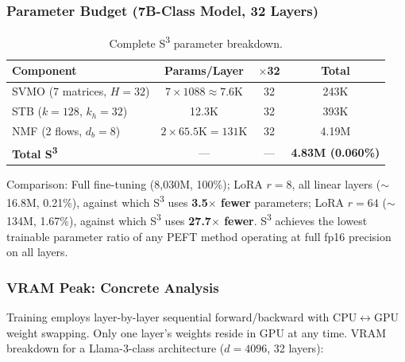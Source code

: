 \documentclass[conference]{IEEEtran}
\begin{document}
\subsubsection{Parameter Budget (7B-Class Model, 32 Layers)}

\begin{table}[t]
\centering
\caption{Complete S\textsuperscript{3} parameter breakdown.}
\label{tab:params}
\setlength{\tabcolsep}{2pt}
\begin{tabular}{@{}lccc@{}}
\toprule
\textbf{Component} & \textbf{Params/Layer} & $\times$32 & \textbf{Total} \\
\midrule
SVMO (7 matrices, $H{=}32$) & $7 \times 1088 \approx 7.6$K & 32 & 243K \\
STB ($k{=}128$, $k_h{=}32$) & 12.3K & 32 & 393K \\
NMF (2 flows, $d_b{=}8$) & $2 \times 65.5\text{K} = 131$K & 32 & 4.19M \\
\midrule
\textbf{Total S\textsuperscript{3}} & --- & --- & \textbf{4.83M (0.060\%)} \\
\bottomrule
\end{tabular}
\end{table}

Comparison: Full fine-tuning (8{,}030M, 100\%); LoRA $r{=}8$, all linear layers ($\sim$16.8M, 0.21\%), against which S\textsuperscript{3} uses \textbf{3.5$\times$ fewer} parameters; LoRA $r{=}64$ ($\sim$134M, 1.67\%), against which S\textsuperscript{3} uses \textbf{27.7$\times$ fewer}. S\textsuperscript{3} achieves the lowest trainable parameter ratio of any PEFT method operating at full fp16 precision on all layers.

\subsubsection{VRAM Peak: Concrete Analysis}
\label{sec:vram-gap}

Training employs layer-by-layer sequential forward/backward with CPU$\leftrightarrow$GPU weight swapping. Only one layer's weights reside in GPU at any time. VRAM breakdown for a Llama-3-class architecture ($d{=}4096$, 32 layers):
\end{document}
